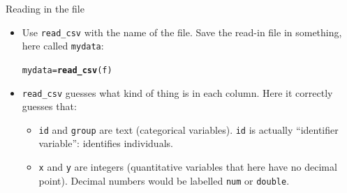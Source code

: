 \documentclass[unknownkeysallowed]{beamer}\usepackage[]{graphicx}\usepackage[]{color}
\makeatletter
\newcommand{\hlstd}[1]{\textcolor[rgb]{0.345,0.345,0.345}{#1}}%
\newcommand{\hlkwb}[1]{\textcolor[rgb]{0.69,0.353,0.396}{#1}}%
\newcommand{\hlkwd}[1]{\textcolor[rgb]{0.737,0.353,0.396}{\textbf{#1}}}%
\newenvironment{kframe}{%
 \def\at@end@of@kframe{}%
 \ifinner\ifhmode%
  \def\at@end@of@kframe{\end{minipage}}%
  \begin{minipage}{\columnwidth}%
 \fi\fi%
 \def\FrameCommand##1{\hskip\@totalleftmargin \hskip-\fboxsep
 \colorbox{shadecolor}{##1}\hskip-\fboxsep
     \hskip-\linewidth \hskip-\@totalleftmargin \hskip\columnwidth}%
 \MakeFramed {\advance\hsize-\width
   \@totalleftmargin\z@ \linewidth\hsize
   \@setminipage}}%
 {\par\unskip\endMakeFramed%
 \at@end@of@kframe}
\newenvironment{knitrout}{}{} %
\makeatother
\begin{document}
\begin{frame}[fragile]{Reading in the file}
  
  \begin{itemize}
  \item Use \texttt{read\_csv} with the name of the file. Save the
    read-in file in something, here called \texttt{mydata}: 
    
\begin{knitrout}
\color{fgcolor}\begin{kframe}
\begin{alltt}
\hlstd{mydata}\hlkwb{=}\hlkwd{read_csv}\hlstd{(f)}
\end{alltt}


{\ttfamily\noindent\itshape\color{messagecolor}{\#\# Parsed with column specification:\\\#\# cols(\\\#\#\ \  id = col\_character(),\\\#\#\ \  x = col\_integer(),\\\#\#\ \  y = col\_integer(),\\\#\#\ \  group = col\_character()\\\#\# )}}\end{kframe}
\end{knitrout}
\item \texttt{read\_csv} guesses what kind of thing is in each
  column. Here it correctly guesses that:
  
  \begin{itemize}
  \item   \texttt{id} and
  \texttt{group} are text (categorical variables). \texttt{id} is
  actually ``identifier variable'': identifies
  individuals. 
\item \texttt{x} and \texttt{y} are integers (quantitative variables
  that here have no decimal point). Decimal numbers would be labelled
  \texttt{num} or \texttt{double}. 

  \end{itemize}
  

  \end{itemize}
  
\end{frame}
\end{document}
